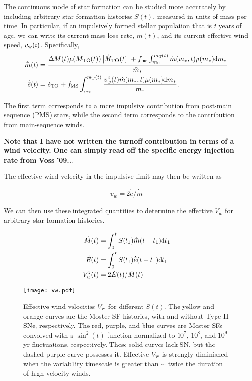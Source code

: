 The continuous mode of star formation can be studied more accurately
by including arbitrary star formation histories $S(t)$, measured in
units of mass per time.  In particular, if an impulsively formed
stellar population that is $t$ years of age, we can write its current
mass loss rate, $\dot{\bar{m}}(t)$, and its current effective wind
speed, $\bar{v}_{\rm w}(t)$.  Specifically,
\begin{align} 
  \dot{\bar{m}}(t) &= \frac{\Delta M(t) \mu(M_{\rm TO}(t))
    \left|\dot{M}_{\rm TO}(t)\right| + f_{\rm ms} \int_{m_0}^{m_{\rm
        T}(t)}
    \dot{m}(m_*, t) \mu(m_*) {\rm d}m_* }{\bar{m}_*}\\
  \dot{\bar{e}}(t) &=\dot{e}_{\rm TO}+ f_{\rm MS} \int_{m_0}^{m_{\rm T}(t)}
  \frac{v_w^2(t) \dot{m}(m_*, t) \mu(m_*) {\rm d}m_*}{\bar{m}_*}.
\end{align} 

The first term corresponds to a more impulsive contribution from
post-main sequence (PMS) stars, while the second term corresponds to
the contribution from main-sequence winds. 


{\bf Note that I have not written the turnoff contribution in terms of
  a wind velocity. One can simply read off the specific energy
  injection rate from Voss '09...}

The effective wind velocity in the impulsive limit may then be written
as 

\begin{align}
\bar{v}_w=2 \dot{\bar{e}}/\dot{\bar{m}}
\end{align}

We can then use these integrated quantities to determine the effective
$V_w$ for arbitrary star formation histories.

\begin{align} 
  \dot{M}(t) &= \int_0^t S(t_1) \dot{\bar{m}}(t-t_1){\rm
      d}t_1\\
  \dot{E}(t) &= \int_0^t S(t_1) \dot{\bar{e}}(t-t_1){\rm
      d}t_1\\
  V_w^2(t) &=2 \dot{E}(t)/\dot{M}(t)
\end{align}

\begin{figure}
\texttt{[image: vw.pdf]}
\caption{\label{NickPlot2} Effective wind velocities $V_{\rm w}$ for
different $S(t)$.  The yellow and orange curves are the Moster SF
histories, with and without Type II SNe, respectively.  The red,
purple, and blue curves are Moster SFs convolved with a $\sin^2(t)$
function normalized to $10^7$, $10^8$, and $10^9$ yr fluctuations,
respectively.  These solid curves lack SN, but the dashed purple curve
possesses it.  Effective $V_{\rm w}$ is strongly diminished when the
variability timescale is greater than $\sim$ twice the duration of
high-velocity winds.}
\end{figure}

